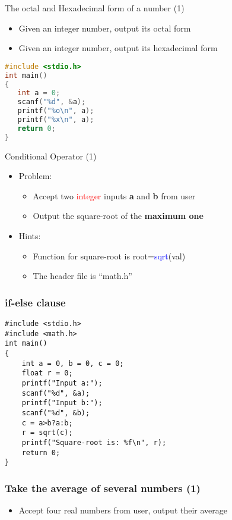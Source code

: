\ifx\answer\undefined
\begin{frame}[fragile]{The octal and Hexadecimal form of a number (1)}
\begin{itemize}
	\item {Given an integer number, output its octal form}
	\item {Given an integer number, output its hexadecimal form}
\end{itemize}

\begin{lstlisting}[numbers=none, language=c, rulecolor=\color{blue}]
#include <stdio.h>
int main()
{
   int a = 0;
   scanf("%d", &a);
   printf("%o\n", a);
   printf("%x\n", a);
   return 0;
}
\end{lstlisting}
\end{frame}
\fi

\begin{frame}{Conditional Operator (1)}
\begin{itemize}
	\item {Problem:}
	\begin{itemize}
		\item {Accept two \textcolor{red}{integer} inputs \textbf{a} and \textbf{b} from user}
		\item {Output the square-root of the \textbf{maximum one}}
	\end{itemize}
	\item {Hints:}
	\begin{itemize}
		\item {Function for square-root is root=\textcolor{blue}{sqrt}(val)}
		\item {The header file is ``math.h''}
	\end{itemize}
\end{itemize}
\end{frame}

\ifx\answer\undefined
\begin{frame}[fragile]\frametitle{if-else clause}
\begin{lstlisting}[basicstyle=\large,xleftmargin=0.05\linewidth, linewidth=0.85\linewidth]
#include <stdio.h>
#include <math.h>
int main()
{
    int a = 0, b = 0, c = 0;
    float r = 0;
    printf("Input a:");
    scanf("%d", &a);
    printf("Input b:");
    scanf("%d", &b);
    c = a>b?a:b;
    r = sqrt(c);
    printf("Square-root is: %f\n", r);
    return 0;
}
\end{lstlisting}
\end{frame}
\fi


\begin{frame}
\frametitle{Take the average of several numbers (1)}
\begin{itemize}
	\item {Accept four real numbers from user, output their average}
\end{itemize}
\end{frame}

